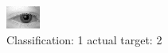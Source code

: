 \begin{figure}[h!]
\begin{center}
\includegraphics[width=0.60\columnwidth]{figures/ID441_class_1_target_2.png}
\end{center}
\caption{ Classification: 1 actual target: 2}
\label{fig:ID441_class_1_target_2}
\end{figure}
